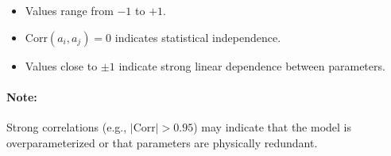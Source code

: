 \begin{itemize}
    \item Values range from $-1$ to $+1$.
    \item $\mathrm{Corr}(a_i, a_j) = 0$ indicates statistical independence.
    \item Values close to $\pm1$ indicate strong linear dependence between parameters.
\end{itemize}

\paragraph{Note:} Strong correlations (e.g., $|\mathrm{Corr}| > 0.95$) may indicate that the model is overparameterized or that parameters are physically redundant.

